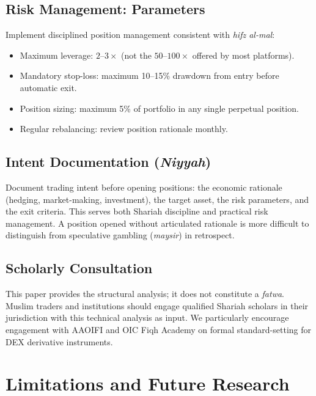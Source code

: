 \documentclass[10pt,twocolumn]{article}
\begin{document}
\subsection{Risk Management: Parameters}

Implement disciplined position management consistent with \textit{hifz al-mal}:
\begin{itemize}[noitemsep, leftmargin=*]
\item Maximum leverage: $2\text{--}3\times$ (not the $50\text{--}100\times$
offered by most platforms).
\item Mandatory stop-loss: maximum 10--15\% drawdown from entry before
automatic exit.
\item Position sizing: maximum 5\% of portfolio in any single perpetual position.
\item Regular rebalancing: review position rationale monthly.
\end{itemize}

\subsection{Intent Documentation (\textit{Niyyah})}

Document trading intent before opening positions: the economic rationale
(hedging, market-making, investment), the target asset, the risk parameters,
and the exit criteria. This serves both Shariah discipline and practical risk
management. A position opened without articulated rationale is more difficult
to distinguish from speculative gambling (\textit{maysir}) in retrospect.

\subsection{Scholarly Consultation}

This paper provides the structural analysis; it does not constitute a
\textit{fatwa}. Muslim traders and institutions should engage qualified Shariah
scholars in their jurisdiction with this technical analysis as input. We
particularly encourage engagement with AAOIFI and OIC Fiqh Academy on formal
standard-setting for DEX derivative instruments.

\section{Limitations and Future Research}
\label{sec:limitations}
\end{document}
